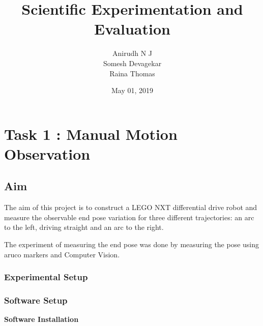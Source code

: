 \documentclass[10pt,a4paper]{article}
\author{\vspace{0.4cm}
	\Large{Anirudh N J}\\\vspace{0.4cm}
	\Large{Somesh Devagekar} \\\vspace{0.8cm}
	\Large{Raina Thomas}}
\title{
	\vspace*{5cm}
	\textbf{\Large{Scientific Experimentation and Evaluation}}
	}
\date{May 01, 2019}
\begin{document}
\begin{titlepage}

	\maketitle
	
\end{titlepage}

	\Large
	\tableofcontents
	\newpage



\section{Task 1 : Manual Motion Observation}

\subsection{Aim}
\Large
The aim of this project is to construct a LEGO NXT differential drive robot and measure the observable end pose variation for three different trajectories: an arc to the left, driving straight and an arc to the right.
\vspace{0.5cm}

The experiment of measuring the end pose was done by measuring the pose using aruco markers and Computer Vision.
   

\subsubsection{Experimental Setup}
	
	\subsubsection{Software Setup}
		\vspace{0.3cm}
	\textbf{Software Installation}\\
			
\end{document}
